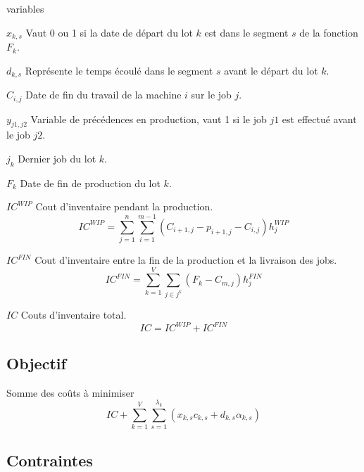 \begin{labeling}{variables}
	\item [$x_{k, s}$]
	Vaut 0 ou 1 si la date de départ du lot $k$ est dans le segment $s$ de la fonction $F_k$.
	\item [$d_{k, s}$]
	Représente le temps écoulé dans le segment $s$ avant le départ du lot $k$.
	\item [$C_{i, j}$]
	Date de fin du travail de la machine $i$ sur le job $j$.
	
	\item [$y_{j1,j2}$]
	Variable de précédences en production, vaut 1 si le job $j1$ est effectué avant le job $j2$.
	\item [$j_k$]
	Dernier job du lot $k$.
	\item [$F_k$] 
	Date de fin de production du lot $k$.
	
	\item [$IC^{WIP}$]
	Cout d'inventaire pendant la production.
	$$IC^{WIP}= \sum_{j=1}^{n} \sum_{i=1}^{m-1} \left(C_{i+1, j} - p_{i+1, j} - C_{i, j} \right) h_j^{WIP}$$
	\item [$IC^{FIN}$]
	Cout d'inventaire entre la fin de la production et la livraison des jobs.
	$$IC^{FIN} = \sum_{k=1}^{V} \sum _{j\in j^k} \left( F_k - C_{m, j} \right) h_j^{FIN}$$
	\item [$IC$]
	Couts d'inventaire total.
	$$IC = IC^{WIP} + IC^{FIN}$$
\end{labeling}


\subsection{Objectif}
Somme des coûts à minimiser
$$IC + \sum_{k=1}^{V} \sum_{s=1}^{\lambda_k} \left(x_{k, s} c_{k, s}+ d_{k,s} \alpha_{k, s} \right)$$

\subsection{Contraintes}

